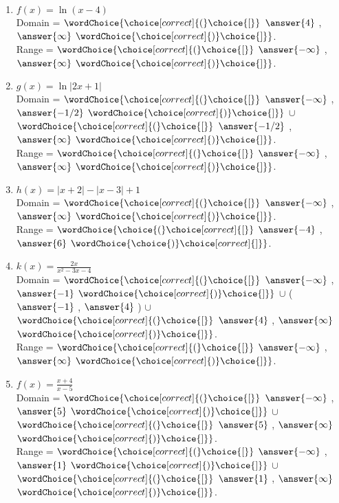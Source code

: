 \documentclass{ximera}
\begin{document}
\begin{exercise}
\begin{enumerate}
\item $f(x) = \ln(x-4)$ \\
Domain = $\wordChoice{\choice[correct]{(}\choice{[}}$ $\answer{4}$ , $\answer{\infty}$ $\wordChoice{\choice[correct]{)}\choice{]}}$.\\
Range = $\wordChoice{\choice[correct]{(}\choice{[}}$ $\answer{-\infty}$ , $\answer{\infty}$ $\wordChoice{\choice[correct]{)}\choice{]}}$.


\item $g(x) =  \ln|2x+1|$ \\
Domain = $\wordChoice{\choice[correct]{(}\choice{[}}$ 
$\answer{-\infty}$ , $\answer{-1/2}$ 
$\wordChoice{\choice[correct]{)}\choice{]}}$ 
$\cup$  
$\wordChoice{\choice[correct]{(}\choice{[}}$ 
$\answer{-1/2}$ , $\answer{\infty}$ 
$\wordChoice{\choice[correct]{)}\choice{]}}$.\\
Range = $\wordChoice{\choice[correct]{(}\choice{[}}$ 
$\answer{-\infty}$ , $\answer{\infty}$ 
$\wordChoice{\choice[correct]{)}\choice{]}}$.


\item $h(x) =  |x+2|-|x-3|+1$ \\
Domain = $\wordChoice{\choice[correct]{(}\choice{[}}$ 
$\answer{-\infty}$ , $\answer{\infty}$ 
$\wordChoice{\choice[correct]{)}\choice{]}}$.\\
Range = $\wordChoice{\choice{(}\choice[correct]{[}}$ $\answer{-4}$ , $\answer{6}$ $\wordChoice{\choice{)}\choice[correct]{]}}$.


\item $k(x)= \frac{2x}{x^2-3x-4}$\\
Domain = $\wordChoice{\choice[correct]{(}\choice{[}}$ 
$\answer{-\infty}$ , $\answer{-1}$ 
$\wordChoice{\choice[correct]{)}\choice{]}}$ 
$\cup$  
\Big( 
$\answer{-1}$ , $\answer{4}$ 
\Big)
$\cup$  
$\wordChoice{\choice[correct]{(}\choice{[}}$ 
$\answer{4}$ , $\answer{\infty}$ 
$\wordChoice{\choice[correct]{)}\choice{]}}$.\\
Range = $\wordChoice{\choice[correct]{(}\choice{[}}$ 
$\answer{-\infty}$ , $\answer{\infty}$ 
$\wordChoice{\choice[correct]{)}\choice{]}}$.


\item $f(x) =  \frac{x+4}{x-5}$\\
Domain = $\wordChoice{\choice[correct]{(}\choice{[}}$ 
$\answer{-\infty}$ , $\answer{5}$ 
$\wordChoice{\choice[correct]{)}\choice{]}}$ 
$\cup$  
$\wordChoice{\choice[correct]{(}\choice{[}}$ 
$\answer{5}$ , $\answer{\infty}$ 
$\wordChoice{\choice[correct]{)}\choice{]}}$.\\
Range = $\wordChoice{\choice[correct]{(}\choice{[}}$ 
$\answer{-\infty}$ , $\answer{1}$ 
$\wordChoice{\choice[correct]{)}\choice{]}}$ 
$\cup$  
$\wordChoice{\choice[correct]{(}\choice{[}}$ 
$\answer{1}$ , $\answer{\infty}$ 
$\wordChoice{\choice[correct]{)}\choice{]}}$.

\end{enumerate}

\end{exercise}
\end{document}
